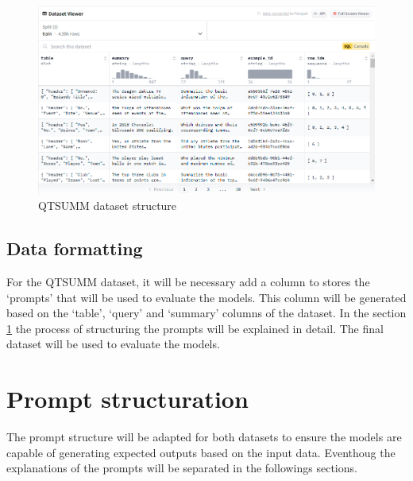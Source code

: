 \begin{figure}[H]
    \centering
    \includegraphics[width=12cm]{images/qsumm_structure.png} 
    \caption{QTSUMM dataset structure \cite{zhao2023qtsummqueryfocusedsummarizationtabular}}
    \label{fig:qsumm-structure}
\end{figure}

\subsection{Data formatting}
For the QTSUMM dataset, it will be necessary add a column to stores the `prompts' that will be used to evaluate the models. This column will be generated based on the `table', `query' and `summary' columns of the dataset. In the section \ref{subsubsec:prompt-structuration} the process of structuring the prompts will be explained in detail. The final dataset will be used to evaluate the models. 

\section{Prompt structuration}\label{subsubsec:prompt-structuration}
The prompt structure will be adapted for both datasets to ensure the models are capable of generating expected outputs based on the input data. Eventhoug the explanations of the prompts will be separated in the followings sections.

